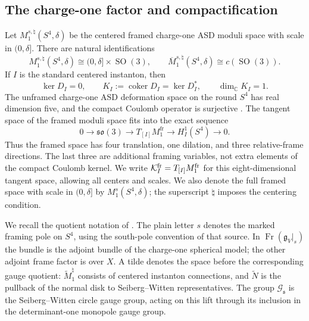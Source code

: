 \documentclass[11pt]{amsart}
\theoremstyle{definition}
\theoremstyle{remark}
\theoremstyle{plain}
\newcommand{\CC}{\mathbb{C}}
\newcommand{\cG}{\mathcal{G}}
\newcommand{\cK}{\mathcal{K}}
\newcommand{\coker}{\operatorname{coker}}
\newcommand{\Fr}{\operatorname{Fr}}
\newcommand{\SO}{\operatorname{SO}}
\begin{document}
\subsection{The charge-one factor and compactification}
Let $M_1^{s,\natural}(S^4,\delta)$ be the centered framed charge-one ASD
moduli space with scale in $(0,\delta]$.  There are natural identifications
\begin{equation}\label{eq:charge-one-cone}
 M_1^{s,\natural}(S^4,\delta)
 \cong(0,\delta]\times\SO(3),
 \qquad
 \overline M_1^{s,\natural}(S^4,\delta)
 \cong c(\SO(3)).
\end{equation}
If $I$ is the standard centered instanton, then
\begin{equation}\label{eq:bubble-cokernel}
 \ker D_I=0,
 \qquad K_I:=\coker D_I=\ker D_I^*,
 \qquad \dim_{\CC}K_I=1.
\end{equation}
The unframed charge-one ASD deformation space on the round $S^4$ has
real dimension five, and the compact Coulomb operator is surjective
\cite[Sections~6 and~9]{AHS78}.  The tangent space of the framed moduli space
fits into the exact sequence
\begin{equation}\label{eq:framed-deformation-sequence}
 0\longrightarrow\mathfrak{so}(3)\longrightarrow
 T_{[I]}M_1^{\mathrm{fr}}\longrightarrow
 H_I^1(S^4)\longrightarrow0.
\end{equation}
Thus the framed space has four translation, one dilation, and three
relative-frame directions.  The last three are additional framing
variables, not extra elements of the compact Coulomb kernel.
We write $\cK_I^{\rm fr}=T_{[I]}M_1^{\rm fr}$ for this
eight-dimensional tangent space, allowing all centers and scales.
We also denote the full framed space with scale in $(0,\delta]$ by
$M_1^s(S^4,\delta)$; the superscript $\natural$ imposes the centering
condition.

We recall the quotient notation of
\cite[Equations~(3.48)--(3.54)]{FeehanLenessLevelOne}.  The plain letter
$s$ denotes the marked framing pole on $S^4$, using the south-pole
convention of that source.  In $\Fr(\mathfrak g_V|_s)$ the bundle is the
adjoint bundle of the charge-one spherical model; the other adjoint frame
factor is over $X$.  A tilde denotes the space before the corresponding
gauge quotient: $\widetilde M_1^\natural$ consists of centered instanton
connections, and $\widetilde N$ is the pullback of the normal disk to
Seiberg--Witten representatives.  The group $\cG_{\mathfrak s}$ is the
Seiberg--Witten circle gauge group, acting on this lift through its inclusion
in the determinant-one monopole gauge group.
\end{document}

